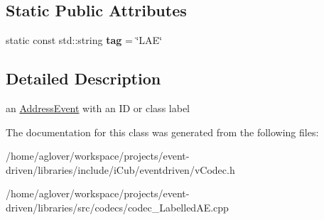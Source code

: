 \subsection*{Static Public Attributes}
\begin{DoxyCompactItemize}
\item 
static const std\+::string {\bfseries tag} = \char`\"{}L\+AE\char`\"{}\hypertarget{classev_1_1LabelledAE_a825f9f0819046248ce7f6d0af4871cec}{}\label{classev_1_1LabelledAE_a825f9f0819046248ce7f6d0af4871cec}

\end{DoxyCompactItemize}


\subsection{Detailed Description}
an \hyperlink{classev_1_1AddressEvent}{Address\+Event} with an ID or class label 

The documentation for this class was generated from the following files\+:\begin{DoxyCompactItemize}
\item 
/home/aglover/workspace/projects/event-\/driven/libraries/include/i\+Cub/eventdriven/v\+Codec.\+h\item 
/home/aglover/workspace/projects/event-\/driven/libraries/src/codecs/codec\+\_\+\+Labelled\+A\+E.\+cpp\end{DoxyCompactItemize}
